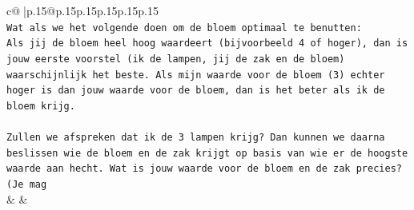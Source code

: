 \documentclass{article}
\begin{document}
{\begin{supertabular}{c@{$\;$}|p{.15\linewidth}@{}p{.15\linewidth}p{.15\linewidth}p{.15\linewidth}p{.15\linewidth}p{.15\linewidth}}
{{{\\ 
\texttt{Wat als we het volgende doen om de bloem optimaal te benutten:} \\
\texttt{Als jij de bloem heel hoog waardeert (bijvoorbeeld 4 of hoger), dan is jouw eerste voorstel (ik de lampen, jij de zak en de bloem) waarschijnlijk het beste. Als mijn waarde voor de bloem (3) echter hoger is dan jouw waarde voor de bloem, dan is het beter als ik de bloem krijg.} \\
\\ 
\texttt{Zullen we afspreken dat ik de 3 lampen krijg? Dan kunnen we daarna beslissen wie de bloem en de zak krijgt op basis van wie er de hoogste waarde aan hecht. Wat is jouw waarde voor de bloem en de zak precies? (Je mag} \\
            }
        }
    }
    & & \\ \\


\end{supertabular}}
\end{document}
